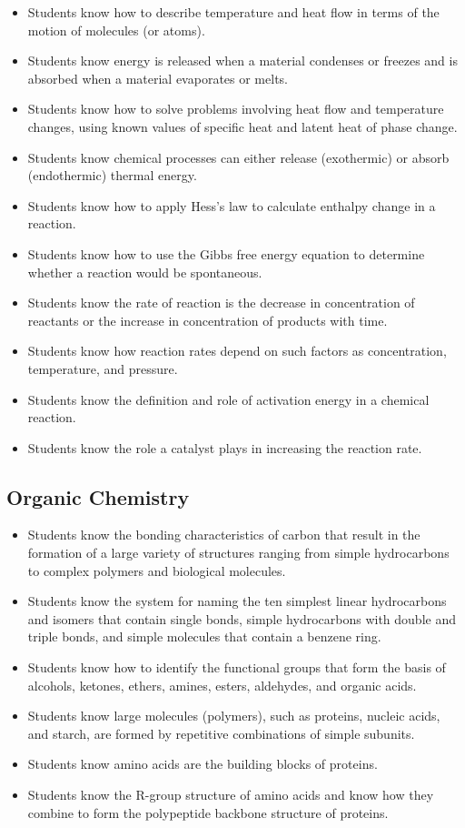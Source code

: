 \documentclass[12pt]{article}
\begin{document}
\begin{itemize}
    \item Students know how to describe temperature and heat flow in terms of the motion of molecules (or atoms).
    \item Students know energy is released when a material condenses or freezes and is absorbed when a material evaporates or melts.
    \item Students know how to solve problems involving heat flow and temperature changes, using known values of specific heat and latent heat of phase change.
    \item Students know chemical processes can either release (exothermic) or absorb (endothermic) thermal energy.
    \item Students know how to apply Hess's law to calculate enthalpy change in a reaction.
    \item Students know how to use the Gibbs free energy equation to determine whether a reaction would be spontaneous.
    \item Students know the rate of reaction is the decrease in concentration of reactants or the increase in concentration of products with time.
    \item Students know how reaction rates depend on such factors as concentration, temperature, and pressure.
    \item Students know the definition and role of activation energy in a chemical reaction.
    \item Students know the role a catalyst plays in increasing the reaction rate.
\end{itemize}

\subsection{Organic Chemistry}

\begin{itemize}
    \item Students know the bonding characteristics of carbon that result in the formation of a large variety of structures ranging from simple hydrocarbons to complex polymers and biological molecules.
    \item Students know the system for naming the ten simplest linear hydrocarbons and isomers that contain single bonds, simple hydrocarbons with double and triple bonds, and simple molecules that contain a benzene ring.
    \item Students know how to identify the functional groups that form the basis of alcohols, ketones, ethers, amines, esters, aldehydes, and organic acids.
    \item Students know large molecules (polymers), such as proteins, nucleic acids, and starch, are formed by repetitive combinations of simple subunits.
    \item Students know amino acids are the building blocks of proteins.
    \item Students know the R-group structure of amino acids and know how they combine to form the polypeptide backbone structure of proteins.
\end{itemize}
\end{document}
